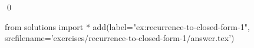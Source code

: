 \begin{ex}
  \label{ex:recurrence-to-closed-form-1}
  
  \qed
\end{ex}
\begin{python0}
from solutions import *
add(label="ex:recurrence-to-closed-form-1",
    srcfilename='exercises/recurrence-to-closed-form-1/answer.tex') 
\end{python0}                              
